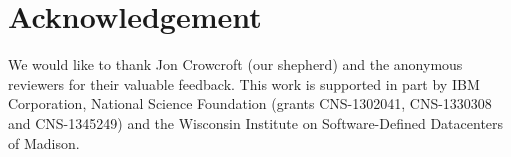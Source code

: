 \documentclass[10pt]{sig-alternate-05-2015}
\begin{document}






%
%

%
%
\printccsdesc


\keywords{Load Balancing; Software-Defined Networking; %
}





%



\section*{Acknowledgement}

We would like to thank Jon Crowcroft (our shepherd) and
the anonymous reviewers for their valuable feedback. This
work is supported in part by IBM Corporation, National
Science Foundation (grants CNS-1302041, CNS-1330308
and CNS-1345249) and the Wisconsin Institute on Software-Defined Datacenters of Madison.
{
\small
\setlength{\bibsep}{0.5pt}
\raggedright
\balance


}
\end{document}
